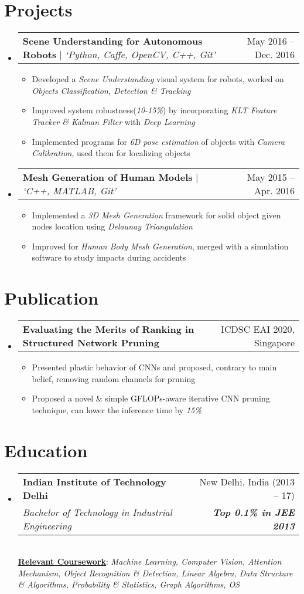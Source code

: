 \documentclass[letterpaper,11pt]{article}
\makeatletter
\newcommand{\resumeItem}[1]{
  \item\small{
    {#1 \vspace{-2pt}}
  }
}
\newcommand{\resumeSubheading}[4]{
  \vspace{-2pt}\item
    \begin{tabular*}{0.97\textwidth}[t]{l@{\extracolsep{\fill}}r}
      \textbf{#1} & #2 \\
      \textit{\small#3} & \textit{\small #4} \\
    \end{tabular*}\vspace{-7pt}
}
\newcommand{\resumeProjectHeading}[2]{
    \item
    \begin{tabular*}{0.97\textwidth}{l@{\extracolsep{\fill}}r}
      \small#1 & #2 \\
    \end{tabular*}\vspace{-7pt}
}
\newcommand{\resumeSubHeadingListStart}{\begin{itemize}[leftmargin=0.15in, label={}]}
\newcommand{\resumeSubHeadingListEnd}{\end{itemize}}
\newcommand{\resumeItemListStart}{\begin{itemize}}
\newcommand{\resumeItemListEnd}{\end{itemize}\vspace{-5pt}}
\makeatother
\begin{document}
\section{Projects}
    \resumeSubHeadingListStart
      \resumeProjectHeading
          {\textbf{Scene Understanding for Autonomous Robots} $|$ \emph{`Python, Caffe, OpenCV, C++, Git'}}{May 2016 -- Dec. 2016}
          \resumeItemListStart
            \resumeItem{Developed a \emph{Scene Understanding} visual system for robots, worked on \emph{Objects Classification, Detection \& Tracking}}
            \resumeItem{Improved system robustness(\emph{10-15\%}) by incorporating \emph{KLT Feature Tracker \& Kalman Filter} with \emph{Deep Learning}}
            \resumeItem{Implemented programs for \emph{6D pose estimation} of objects with \emph{Camera Calibration}, used them for localizing objects}
          \resumeItemListEnd
      \resumeProjectHeading
          {\textbf{Mesh Generation of Human Models} $|$ \emph{`C++, MATLAB, Git'}}{May 2015 -- Apr. 2016}
          \resumeItemListStart
            \resumeItem{Implemented a \emph{3D Mesh Generation} framework for solid object given nodes location using \emph{Delaunay Triangulation}}
            \resumeItem{Improved for \emph{Human Body Mesh Generation}, merged with a simulation software to study impacts during accidents}
          \resumeItemListEnd
    \resumeSubHeadingListEnd



\section{Publication}
    \resumeSubHeadingListStart
      \resumeProjectHeading
          {\textbf{Evaluating the Merits of Ranking in Structured Network Pruning}}{ICDSC EAI 2020, Singapore}
          \resumeItemListStart
            \resumeItem{Presented plastic behavior of CNNs and proposed, contrary to main belief, removing random channels for pruning}
            \resumeItem{Proposed a novel \& simple GFLOPs-aware iterative CNN pruning technique, can lower the inference time by \emph{15\%} }
          \resumeItemListEnd
    \resumeSubHeadingListEnd



\section{Education}
  \resumeSubHeadingListStart
    \resumeSubheading
      {Indian Institute of Technology Delhi}{New Delhi, India (2013 -- 17)}
      {Bachelor of Technology in Industrial Engineering}{\textbf{Top 0.1\% in JEE 2013}} \\ 
      \vspace{9pt}
      \textbf{\underline{Relevant Coursework}}{: \emph{Machine Learning, Computer Vision, Attention Mechanism, Object Recognition \& Detection, Linear Algebra, Data Structure \& Algorithms, Probability \& Statistics, Graph Algorithms, OS}}
  \resumeSubHeadingListEnd
\end{document}
